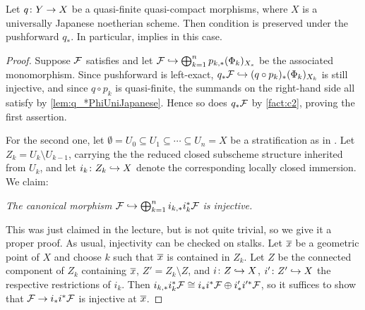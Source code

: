 \begin{lem}\label{lem:c1c2UniJapanese}
	Let $q\colon Y\morphism X$ be a quasi-finite quasi-compact morphisms, where $X$ is a universally Japanese noetherian scheme. Then condition  is preserved under the pushforward $q_*$. In particular,  implies  in this case.
\end{lem}
\begin{proof}
	Suppose $\mathcal{F}$ satisfies  and let $\Ff\monomorphism\bigoplus_{k=1}^np_{k,*}(\Phi_k)_{X_s}$ be the associated monomorphism. Since pushforward is left-exact, $q_*\Ff\monomorphism (q\circ p_k)_*(\Phi_k)_{X_k}$ is still injective, and since $q\circ p_k$ is quasi-finite, the summands on the right-hand side all satisfy  by \cref{lem:q_*PhiUniJapanese}. Hence so does $q_*\mathcal{F}$ by \cref{fact:c2}, proving the first assertion.
	
	For the second one, let $\emptyset=U_0\subseteq U_1\subseteq\dotsb\subseteq U_n=X$ be a stratification as in . Let $Z_k= U_k\setminus U_{k-1}$, carrying the the reduced closed subscheme structure inherited from $U_k$, and let $i_k\colon Z_k\monomorphism X$ denote the corresponding locally closed immersion. We claim:
	\begin{alphanumerate}
		\item[\itememph{*}] \itshape The canonical morphism $\Ff\monomorphism \bigoplus_{k=1}^ni_{k,*}i_k^*\Ff$ is injective.
	\end{alphanumerate}
	This was just claimed in the lecture, but is not quite trivial, so we give it a proper proof. As usual, injectivity can be checked on stalks. Let $\ov{x}$ be a geometric point of $X$ and choose $k$ such that $\ov{x}$ is contained in $Z_k$. Let $Z$ be the connected component of $Z_k$ containing $\ov{x}$, $Z'= Z_k\setminus Z$, and $i\colon Z\monomorphism X$, $i'\colon Z'\monomorphism X$ the respective restrictions of $i_k$. Then $i_{k,*}i_k^*\mathcal{F}\cong i_*i^*\mathcal{F}\oplus i'_*i'^*\mathcal{F}$, so it suffices to show that $\Ff\morphism i_*i^*\Ff$ is injective at $\ov{x}$.
	

\end{proof}

